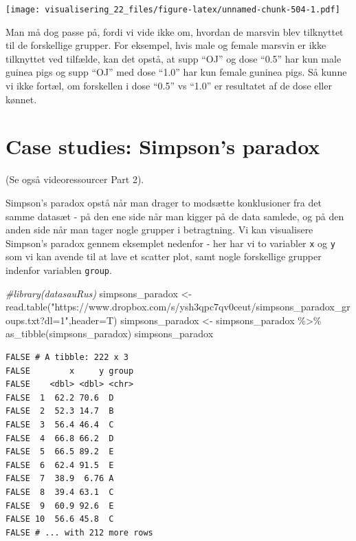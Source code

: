 \documentclass[
]{book}
\newenvironment{Shaded}{\begin{snugshade}}{\end{snugshade}}
\newcommand{\AttributeTok}[1]{\textcolor[rgb]{0.77,0.63,0.00}{#1}}
\newcommand{\CommentTok}[1]{\textcolor[rgb]{0.56,0.35,0.01}{\textit{#1}}}
\newcommand{\FunctionTok}[1]{\textcolor[rgb]{0.00,0.00,0.00}{#1}}
\newcommand{\NormalTok}[1]{#1}
\newcommand{\OtherTok}[1]{\textcolor[rgb]{0.56,0.35,0.01}{#1}}
\newcommand{\SpecialCharTok}[1]{\textcolor[rgb]{0.00,0.00,0.00}{#1}}
\newcommand{\StringTok}[1]{\textcolor[rgb]{0.31,0.60,0.02}{#1}}
\begin{document}
\texttt{[image: visualisering\_22\_files/figure-latex/unnamed-chunk-504-1.pdf]}

Man må dog passe på, fordi vi vide ikke om, hvordan de marsvin blev tilknyttet til de forskellige grupper. For eksempel, hvis male og female marsvin er ikke tilknyttet ved tilfælde, kan det opstå, at supp ``OJ'' og dose ``0.5'' har kun male guinea pigs og supp ``OJ'' med dose ``1.0'' har kun female guninea pigs. Så kunne vi ikke fortæl, om forskellen i dose ``0.5'' vs ``1.0'' er resultatet af de dose eller kønnet.

\hypertarget{case-studies-simpsons-paradox}{%
\section{Case studies: Simpson's paradox}\label{case-studies-simpsons-paradox}}

(Se også videoressourcer Part 2).

Simpson's paradox opstå når man drager to modsætte konklusioner fra det samme datasæt - på den ene side når man kigger på de data samlede, og på den anden side når man tager nogle grupper i betragtning. Vi kan visualisere Simpson's paradox gennem eksemplet nedenfor - her har vi to variabler \texttt{x} og \texttt{y} som vi kan avende til at lave et scatter plot, samt nogle forskellige grupper indenfor variablen \texttt{group}.

\begin{Shaded}
\begin{Highlighting}[]
\CommentTok{\#library(datasauRus)}
\NormalTok{simpsons\_paradox }\OtherTok{\textless{}{-}} \FunctionTok{read.table}\NormalTok{(}\StringTok{"https://www.dropbox.com/s/ysh3qpc7qv0ceut/simpsons\_paradox\_groups.txt?dl=1"}\NormalTok{,}\AttributeTok{header=}\NormalTok{T)}
\NormalTok{simpsons\_paradox }\OtherTok{\textless{}{-}}\NormalTok{ simpsons\_paradox }\SpecialCharTok{\%\textgreater{}\%} \FunctionTok{as\_tibble}\NormalTok{(simpsons\_paradox)}
\NormalTok{simpsons\_paradox}
\end{Highlighting}
\end{Shaded}

\begin{verbatim}
FALSE # A tibble: 222 x 3
FALSE        x     y group
FALSE    <dbl> <dbl> <chr>
FALSE  1  62.2 70.6  D    
FALSE  2  52.3 14.7  B    
FALSE  3  56.4 46.4  C    
FALSE  4  66.8 66.2  D    
FALSE  5  66.5 89.2  E    
FALSE  6  62.4 91.5  E    
FALSE  7  38.9  6.76 A    
FALSE  8  39.4 63.1  C    
FALSE  9  60.9 92.6  E    
FALSE 10  56.6 45.8  C    
FALSE # ... with 212 more rows
\end{verbatim}
\end{document}
